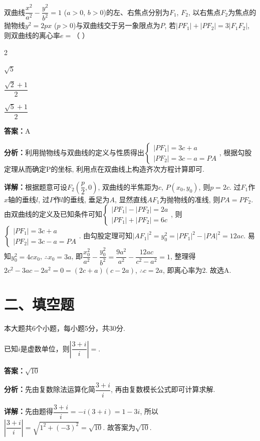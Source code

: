 \begin{question}[points=5]
双曲线$\dfrac{x^2}{a^2} - \dfrac{y^2}{b^2} = 1$ ($a > 0$, $b > 0$)的左、右焦点分别为$F_1$, $F_2$, 以右焦点$F_2$为焦点的抛物线$y^2 = 2px$ ($p > 0$)与双曲线交于另一象限点为$P$, 若$|PF_1| + |PF_2| = 3|F_1F_2|$, 则双曲线的离心率$e = $（   ）
\begin{choices}
  \item 2
  \item $\sqrt{5}$
  \item $\dfrac{\sqrt{2}+1}{2}$
  \item $\dfrac{\sqrt{5}+1}{2}$
\end{choices}
\begin{solution}
\textbf{答案：}A

\textbf{分析：}利用抛物线与双曲线的定义与性质得出$\begin{cases} |PF_1| = 3c + a \\ |PF_2| = 3c - a = PA \end{cases}$, 根据勾股定理从而确定P的坐标, 利用点在双曲线上构造齐次方程计算即可.

\textbf{详解：}根据题意可设$F_2\left( \dfrac{p}{2}, 0 \right)$, 双曲线的半焦距为$c$, $P(x_0, y_0)$, 则$p = 2c$. 过$F_1$作$x$轴的垂线$l$, 过$P$作$l$的垂线, 垂足为$A$, 显然直线$AF_1$为抛物线的准线, 则$PA = PF_2$. 由双曲线的定义及已知条件可知$\begin{cases} |PF_1| - |PF_2| = 2a \\ |PF_1| + |PF_2| = 6c \end{cases}$, 则$\begin{cases} |PF_1| = 3c + a \\ |PF_2| = 3c - a = PA \end{cases}$. 由勾股定理可知$|AF_1|^2 = y_0^2 = |PF_1|^2 - |PA|^2 = 12ac$. 易知$y_0^2 = 4cx_0$, $\therefore x_0 = 3a$, 即$\dfrac{x_0^2}{a^2} - \dfrac{y_0^2}{b^2} = \dfrac{9a^2}{a^2} - \dfrac{12ac}{c^2 - a^2} = 1$, 整理得$2c^2 - 3ac - 2a^2 = 0 = (2c + a)(c - 2a)$, $\therefore c = 2a$, 即离心率为2. 故选A.
\end{solution}
\end{question}

\section*{二、填空题}
本大题共6个小题，每小题5分，共30分.

\begin{question}[points=5]
已知$i$是虚数单位，则$\left| \dfrac{3+i}{i} \right| = $.
\fillin[{$\sqrt{10}$}]
\begin{solution}
\textbf{答案：}$\sqrt{10}$

\textbf{分析：}先由复数除法运算化简$\dfrac{3+i}{i}$, 再由复数模长公式即可计算求解.

\textbf{详解：}先由题得$\dfrac{3+i}{i} = -i(3+i) = 1 - 3i$, 所以$\left| \dfrac{3+i}{i} \right| = \sqrt{1^2 + (-3)^2} = \sqrt{10}$. 故答案为$\sqrt{10}$.
\end{solution}
\end{question}

